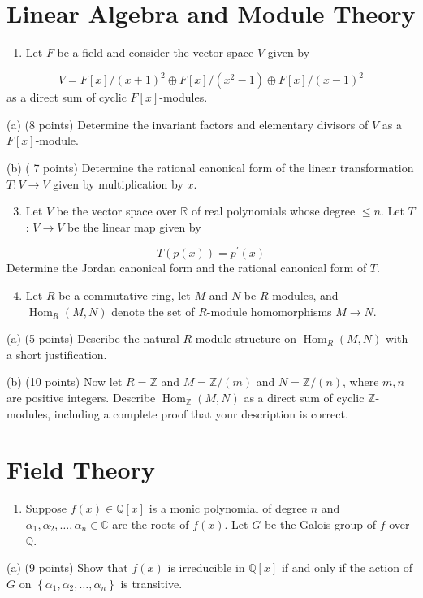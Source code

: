 \documentclass[10pt]{article}
\begin{document}
\section{Linear Algebra and Module Theory}
\begin{enumerate}
  \item Let $F$ be a field and consider the vector space $V$ given by
\end{enumerate}
$$
V=F[x] /(x+1)^{2} \oplus F[x] /\left(x^{2}-1\right) \oplus F[x] /(x-1)^{2}
$$
as a direct sum of cyclic $F[x]$-modules.

(a) (8 points) Determine the invariant factors and elementary divisors of $V$ as a $F[x]$-module.

(b) ( 7 points) Determine the rational canonical form of the linear transformation $T: V \longrightarrow V$ given by multiplication by $x .$

\begin{enumerate}
  \setcounter{enumi}{2}
  \item Let $V$ be the vector space over $\mathbb{R}$ of real polynomials whose degree $\leq n$. Let $T$ : $V \longrightarrow V$ be the linear map given by
\end{enumerate}
$$
T(p(x))=p^{\prime}(x)
$$
Determine the Jordan canonical form and the rational canonical form of $T$.

\begin{enumerate}
  \setcounter{enumi}{3}
  \item Let $R$ be a commutative ring, let $M$ and $N$ be $R$-modules, and $\operatorname{Hom}_{R}(M, N)$ denote the set of $R$-module homomorphisms $M \rightarrow N$.
\end{enumerate}
(a) (5 points) Describe the natural $R$-module structure on $\operatorname{Hom}_{R}(M, N)$ with a short justification.

(b) (10 points) Now let $R=\mathbb{Z}$ and $M=\mathbb{Z} /(m)$ and $N=\mathbb{Z} /(n)$, where $m, n$ are positive integers. Describe $\operatorname{Hom}_{\mathbb{Z}}(M, N)$ as a direct sum of cyclic $\mathbb{Z}$-modules, including a complete proof that your description is correct.

\section{Field Theory}
\begin{enumerate}
  \item Suppose $f(x) \in \mathbb{Q}[x]$ is a monic polynomial of degree $n$ and $\alpha_{1}, \alpha_{2}, \ldots, \alpha_{n} \in \mathbb{C}$ are the roots of $f(x)$. Let $G$ be the Galois group of $f$ over $\mathbb{Q}$.
\end{enumerate}
(a) (9 points) Show that $f(x)$ is irreducible in $\mathbb{Q}[x]$ if and only if the action of $G$ on $\left\{\alpha_{1}, \alpha_{2}, \ldots, \alpha_{n}\right\}$ is transitive.
\end{document}
